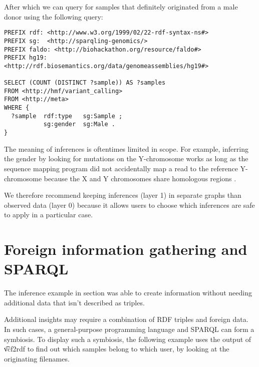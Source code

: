   After which we can query for samples that definitely originated from a male
  donor using the following query:

\begin{siderules}
\begin{verbatim}
PREFIX rdf: <http://www.w3.org/1999/02/22-rdf-syntax-ns#>
PREFIX sg:  <http://sparqling-genomics/>
PREFIX faldo: <http://biohackathon.org/resource/faldo#>
PREFIX hg19:  <http://rdf.biosemantics.org/data/genomeassemblies/hg19#>

SELECT (COUNT (DISTINCT ?sample)) AS ?samples
FROM <http://hmf/variant_calling>
FROM <http://meta>
WHERE {
  ?sample  rdf:type   sg:Sample ;
           sg:gender  sg:Male .
}
\end{verbatim}
\end{siderules}

  The meaning of inferences is oftentimes limited in scope.  For example,
  inferring the gender by looking for mutations on the Y-chromosome works
  as long as the sequence mapping program did not accidentally map a read
  to the reference Y-chromosome because the X and Y chromosomes share
  homologous regions \citep{El-Mogharbel2008}.

  We therefore recommend keeping inferences (layer 1) in separate graphs
  than observed data (layer 0) because it allows users to choose which
  inferences are safe to apply in a particular case.


\section{Foreign information gathering and SPARQL}

  The inference example in section 
  was able to create information without needing additional data that isn't
  described as triples.

  Additional insights may require a combination of RDF triples and foreign
  data.  In such cases, a general-purpose programming language and SPARQL can
  form a symbiosis.  To display such a symbiosis, the following example uses
  the output of \t{vcf2rdf} to find out which samples belong to which
  user, by looking at the originating filenames.

